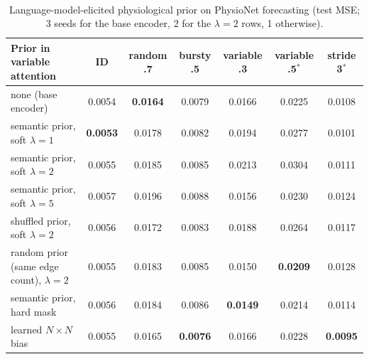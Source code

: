\documentclass[sigconf,nonacm]{acmart}
\newcommand{\prelim}{\textsuperscript{\dag}}
\begin{document}
\begin{table}[t]
\caption{Language-model-elicited physiological prior on PhysioNet forecasting (test MSE\prelim; 3 seeds for the
base encoder, 2 for the $\lambda=2$ rows, 1 otherwise).}
\label{tab:physprior}
\small
\begin{tabular}{lcccccc}
\toprule
Prior in variable attention & ID & random .7 & bursty .5 & variable .3 & variable .5$^*$ & stride 3$^*$ \\
\midrule
none (base encoder) & 0.0054 & \textbf{0.0164} & 0.0079 & 0.0166 & 0.0225 & 0.0108 \\
semantic prior, soft $\lambda=1$ & \textbf{0.0053} & 0.0178 & 0.0082 & 0.0194 & 0.0277 & 0.0101 \\
semantic prior, soft $\lambda=2$ & 0.0055 & 0.0185 & 0.0085 & 0.0213 & 0.0304 & 0.0111 \\
semantic prior, soft $\lambda=5$ & 0.0057 & 0.0196 & 0.0088 & 0.0156 & 0.0230 & 0.0124 \\
shuffled prior, soft $\lambda=2$ & 0.0056 & 0.0172 & 0.0083 & 0.0188 & 0.0264 & 0.0117 \\
random prior (same edge count), $\lambda=2$ & 0.0055 & 0.0183 & 0.0085 & 0.0150 & \textbf{0.0209} & 0.0128 \\
semantic prior, hard mask & 0.0056 & 0.0184 & 0.0086 & \textbf{0.0149} & 0.0214 & 0.0114 \\
learned $N\times N$ bias & 0.0055 & 0.0165 & \textbf{0.0076} & 0.0166 & 0.0228 & \textbf{0.0095} \\
\bottomrule
\end{tabular}
\end{table}
\end{document}
